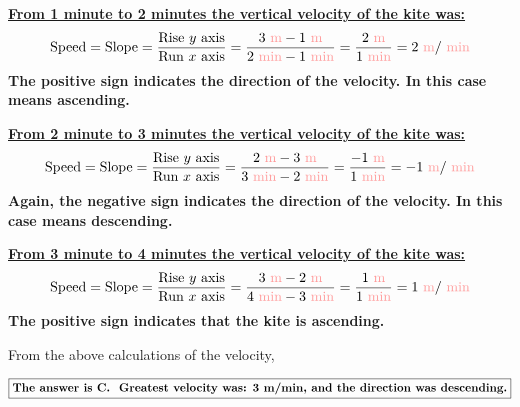 \documentclass[A4,12pt]{article}
\begin{document}
\begin{enumerate}[label=\bfseries (\arabic*)]
\begin{example}
\textbf{\underline{From 1 minute to 2 minutes the vertical velocity of the kite was:}}
\begin{equation*}
    \text{Speed}=\text{Slope}=\frac{\text{Rise $y$ axis}}{\text{Run $x$ axis}}=\frac{\msis{3}-\msis{1}}{\mincgs{2}-\mincgs{1}}=\frac{\msis{2}}{\mincgs{1}}=2 \msis{}/\mincgs{}
\end{equation*}
\textbf{The positive sign indicates the direction of the velocity. In this case means ascending.}

\textbf{\underline{From 2 minute to 3 minutes the vertical velocity of the kite was:}}
\begin{equation*}
    \text{Speed}=\text{Slope}=\frac{\text{Rise $y$ axis}}{\text{Run $x$ axis}}=\frac{\msis{2}-\msis{3}}{\mincgs{3}-\mincgs{2}}=\frac{\msis{-1}}{\mincgs{1}}=-1 \msis{}/\mincgs{}
\end{equation*}
\textbf{Again, the negative sign indicates the direction of the velocity. In this case means descending.}


\textbf{\underline{From 3 minute to 4 minutes the vertical velocity of the kite was:}}
\begin{equation*}
    \text{Speed}=\text{Slope}=\frac{\text{Rise $y$ axis}}{\text{Run $x$ axis}}=\frac{\msis{3}-\msis{2}}{\mincgs{4}-\mincgs{3}}=\frac{\msis{1}}{\mincgs{1}}=1 \msis{}/\mincgs{}
\end{equation*}
\textbf{The positive sign indicates that the kite is ascending.}

From the above calculations of the velocity,

\begin{equation*}
    \boxed{\text{\bf{The answer is C. }}
    \textbf{ Greatest velocity was: } \bm{3} \text{\textbf{ m/min, and the direction was descending.}}}
\end{equation*}
\end{example}
%



































\end{enumerate}
\end{document}
